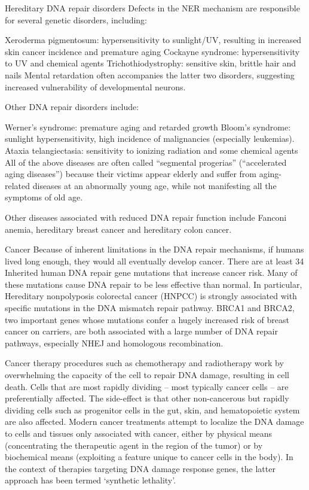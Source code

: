 Hereditary DNA repair disorders
Defects in the NER mechanism are responsible for several genetic disorders, including:

Xeroderma pigmentosum: hypersensitivity to sunlight/UV, resulting in increased skin cancer incidence and premature aging
Cockayne syndrome: hypersensitivity to UV and chemical agents
Trichothiodystrophy: sensitive skin, brittle hair and nails
Mental retardation often accompanies the latter two disorders, suggesting increased vulnerability of developmental neurons.

Other DNA repair disorders include:

Werner's syndrome: premature aging and retarded growth
Bloom's syndrome: sunlight hypersensitivity, high incidence of malignancies (especially leukemias).
Ataxia telangiectasia: sensitivity to ionizing radiation and some chemical agents
All of the above diseases are often called ``segmental progerias'' (``accelerated aging diseases'') because their victims appear elderly and suffer from aging-related diseases at an abnormally young age, while not manifesting all the symptoms of old age.

Other diseases associated with reduced DNA repair function include Fanconi anemia, hereditary breast cancer and hereditary colon cancer.

Cancer
Because of inherent limitations in the DNA repair mechanisms, if humans lived long enough, they would all eventually develop cancer. There are at least 34 Inherited human DNA repair gene mutations that increase cancer risk. Many of these mutations cause DNA repair to be less effective than normal. In particular, Hereditary nonpolyposis colorectal cancer (HNPCC) is strongly associated with specific mutations in the DNA mismatch repair pathway. BRCA1 and BRCA2, two important genes whose mutations confer a hugely increased risk of breast cancer on carriers, are both associated with a large number of DNA repair pathways, especially NHEJ and homologous recombination.

Cancer therapy procedures such as chemotherapy and radiotherapy work by overwhelming the capacity of the cell to repair DNA damage, resulting in cell death. Cells that are most rapidly dividing -- most typically cancer cells -- are preferentially affected. The side-effect is that other non-cancerous but rapidly dividing cells such as progenitor cells in the gut, skin, and hematopoietic system are also affected. Modern cancer treatments attempt to localize the DNA damage to cells and tissues only associated with cancer, either by physical means (concentrating the therapeutic agent in the region of the tumor) or by biochemical means (exploiting a feature unique to cancer cells in the body). In the context of therapies targeting DNA damage response genes, the latter approach has been termed `synthetic lethality'.

